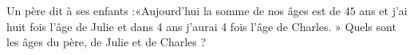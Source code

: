 
\begin{exercice}\label{exosmath-0227}

    Un père dit à ses enfants :«Aujourd'hui la somme de nos âges est de \( 45\) ans et j'ai huit fois l'âge de Julie et dans 4 ans j'aurai 4 fois l'âge de Charles. » Quels sont les âges du père, de Julie et de Charles ?

\end{exercice}
